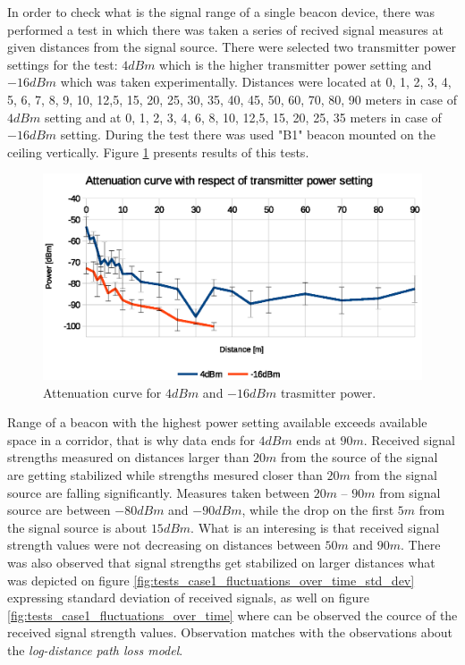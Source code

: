 \documentclass[../main.tex]{subfiles}
\begin{document}
In order to check what is the signal range of a single beacon device, there was performed a test in which there was taken a series of recived signal measures at given distances from the signal source. There were selected two transmitter power settings for the test: $4 dBm$ which is the higher transmitter power setting and $-16 dBm$ which was taken experimentally. Distances were located at 0, 1, 2, 3, 4, 5, 6, 7, 8, 9, 10, 12,5, 15, 20, 25, 30, 35, 40, 45, 50, 60, 70, 80, 90 meters in case of $4 dBm$ setting and at 0, 1, 2, 3, 4, 6, 8, 10, 12,5, 15, 20, 25, 35 meters in case of $-16 dBm$ setting. During the test there was used "B1" beacon mounted on the ceiling vertically. Figure \ref{fig:tests_case1_attenuation} presents results of this tests.

\begin{figure}[ht]
\includegraphics[width=\textwidth, keepaspectratio]{pictures/tests_case1_attenuation}
\centering
\caption{Attenuation curve for $4 dBm$ and $-16 dBm$ trasmitter power.}
\label{fig:tests_case1_attenuation}
\end{figure}

Range of a beacon with the highest power setting available exceeds available space in a corridor, that is why data ends for $4 dBm$ ends at $90 m$. Received signal strengths measured on distances larger than $20m$ from the source of the signal are getting stabilized while strengths mesured closer than $20m$ from the signal source are falling significantly. Measures taken between $20m$ -- $90m$ from signal source are between $-80 dBm$ and $-90 dBm$, while the drop on the first $5m$ from the signal source is about $15 dBm$. What is an interesing is that received signal strength values were not decreasing on distances between $50m$ and $90m$. There was also observed that signal strengths get stabilized on larger distances what was depicted on figure \ref{fig:tests_case1_fluctuations_over_time_std_dev} expressing standard deviation of received signals, as well on figure \ref{fig:tests_case1_fluctuations_over_time} where can be observed the cource of the received signal strength values. Observation matches with the observations about the \textit{log-distance path loss model}.
\end{document}
